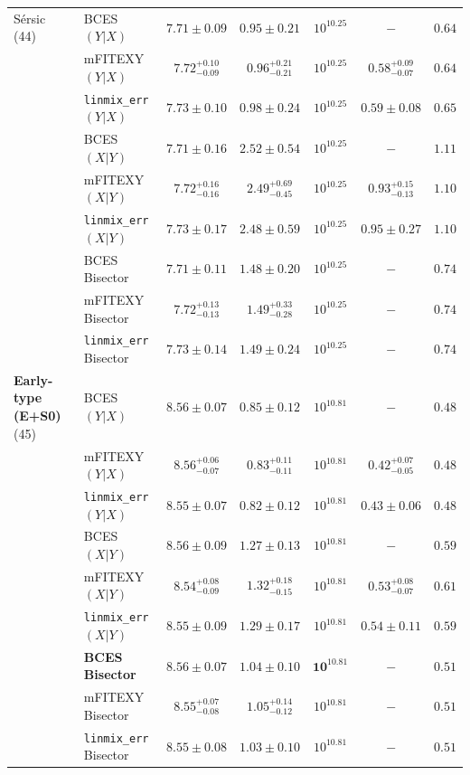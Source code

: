 \documentclass[preprint2]{emulateapj}
\begin{document}
\begin{table}
\begin{tabular}{llccccc}
 S\'ersic (44)		& BCES $(Y|X)$      & $7.71 \pm 0.09$ & $0.95 \pm 0.21$ & $10^{10.25}$ & $-$ & $0.64$ \\
 			& mFITEXY $(Y|X)$   & $7.72^{+0.10}_{-0.09}$ & $0.96^{+0.21}_{-0.21}$ & $10^{10.25}$ & $0.58^{+0.09}_{-0.07}$ & $0.64$ \\
 			& {\tt linmix\_err} $(Y|X)$     & $7.73 \pm 0.10$ & $0.98 \pm 0.24$ & $10^{10.25}$ & $0.59 \pm 0.08$ & $0.65$ \\ [0.5em]
 			& BCES $(X|Y)$      & $7.71 \pm 0.16$ & $2.52 \pm 0.54$ & $10^{10.25}$ & $-$ & $1.11$ \\
 			& mFITEXY $(X|Y)$   & $7.72^{+0.16}_{-0.16}$ & $2.49^{+0.69}_{-0.45}$ & $10^{10.25}$ & $0.93^{+0.15}_{-0.13}$ & $1.10$ \\
 			& {\tt linmix\_err} $(X|Y)$     & $7.73 \pm 0.17$ & $2.48 \pm 0.59$ & $10^{10.25}$ & $0.95 \pm 0.27$ & $1.10$ \\ [0.5em]
 			& BCES Bisector     & $7.71 \pm 0.11$ & $1.48 \pm 0.20$ & $10^{10.25}$ & $-$ & $0.74$ \\
 			& mFITEXY Bisector  & $7.72^{+0.13}_{-0.13}$ & $1.49^{+0.33}_{-0.28}$ & $10^{10.25}$ & $-$    & $0.74$ \\
 			& {\tt linmix\_err} Bisector	& $7.73 \pm 0.14$ & $1.49 \pm 0.24$ & $10^{10.25}$ & $-$	& $0.74$ \\ [0.5em]

{\bf Early-type (E+S0)} (45)  & BCES $(Y|X)$       & $8.56 \pm 0.07$ & $0.85 \pm 0.12$ & $10^{10.81}$ & $-$ & $0.48$ \\
                              & mFITEXY $(Y|X)$     & $8.56^{+0.06}_{-0.07}$ & $0.83^{+0.11}_{-0.11}$ & $10^{10.81}$ & $0.42^{+0.07}_{-0.05}$ & $0.48$ \\
                              & {\tt linmix\_err} $(Y|X)$     & $8.55 \pm 0.07$ & $0.82 \pm 0.12$ & $10^{10.81}$ & $0.43 \pm 0.06$ & $0.48$ \\ [0.5em]
                              & BCES $(X|Y)$       & $8.56 \pm 0.09$ & $1.27 \pm 0.13$ & $10^{10.81}$ & $-$ & $0.59$ \\
                              & mFITEXY $(X|Y)$     & $8.54^{+0.08}_{-0.09}$ & $1.32^{+0.18}_{-0.15}$ & $10^{10.81}$ & $0.53^{+0.08}_{-0.07}$ & $0.61$ \\
                              & {\tt linmix\_err} $(X|Y)$     & $8.55 \pm 0.09$ & $1.29 \pm 0.17$ & $10^{10.81}$ & $0.54 \pm 0.11$ & $0.59$ \\ [0.5em]
                              & {\bf BCES Bisector}& $\boldsymbol{8.56 \pm 0.07}$ & $\boldsymbol{1.04 \pm 0.10}$ & $\boldsymbol{10^{10.81}}$ & $-$ & $\boldsymbol{0.51}$ \\
                              & mFITEXY Bisector    & $8.55^{+0.07}_{-0.08}$ & $1.05^{+0.14}_{-0.12}$ & $10^{10.81}$ & $-$                    & $0.51$ \\
                              & {\tt linmix\_err} Bisector    & $8.55 \pm 0.08$ & $1.03 \pm 0.10$ & $10^{10.81}$ & $-$    & $0.51$ \\ [0.5em]


\end{tabular}
\end{table}
\end{document}
